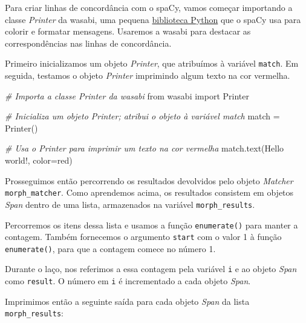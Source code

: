 \documentclass[
  brazilian,
]{article}
\newenvironment{Shaded}{}{}
\newcommand{\CommentTok}[1]{\textcolor[rgb]{0.38,0.63,0.69}{\textit{#1}}}
\newcommand{\ImportTok}[1]{#1}
\newcommand{\NormalTok}[1]{#1}
\newcommand{\OperatorTok}[1]{\textcolor[rgb]{0.40,0.40,0.40}{#1}}
\newcommand{\StringTok}[1]{\textcolor[rgb]{0.25,0.44,0.63}{#1}}
\begin{document}
Para criar linhas de concordância com o spaCy, vamos começar importando
a classe \emph{Printer} da wasabi, uma pequena
\href{https://pypi.org/project/wasabi/}{biblioteca Python} que o spaCy
usa para colorir e formatar mensagens. Usaremos a wasabi para destacar
as correspondências nas linhas de concordância.

Primeiro inicializamos um objeto \emph{Printer}, que atribuímos à
variável \texttt{match}. Em seguida, testamos o objeto \emph{Printer}
imprimindo algum texto na cor vermelha.

\begin{Shaded}
\begin{Highlighting}[]
\CommentTok{\# Importa a classe Printer da wasabi}
\ImportTok{from}\NormalTok{ wasabi }\ImportTok{import}\NormalTok{ Printer}

\CommentTok{\# Inicializa um objeto Printer; atribui o objeto à variável \textquotesingle{}match\textquotesingle{}}
\NormalTok{match }\OperatorTok{=}\NormalTok{ Printer()}

\CommentTok{\# Usa o Printer para imprimir um texto na cor vermelha}
\NormalTok{match.text(}\StringTok{\textquotesingle{}Hello world!\textquotesingle{}}\NormalTok{, color}\OperatorTok{=}\StringTok{\textquotesingle{}red\textquotesingle{}}\NormalTok{)}
\end{Highlighting}
\end{Shaded}

Prosseguimos então percorrendo os resultados devolvidos pelo objeto
\emph{Matcher} \texttt{morph\_matcher}. Como aprendemos acima, os
resultados consistem em objetos \emph{Span} dentro de uma lista,
armazenados na variável \texttt{morph\_results}.

Percorremos os itens dessa lista e usamos a função \texttt{enumerate()}
para manter a contagem. Também fornecemos o argumento \texttt{start} com
o valor 1 à função \texttt{enumerate()}, para que a contagem comece no
número 1.

Durante o laço, nos referimos a essa contagem pela variável \texttt{i} e
ao objeto \emph{Span} como \texttt{result}. O número em \texttt{i} é
incrementado a cada objeto \emph{Span}.

Imprimimos então a seguinte saída para cada objeto \emph{Span} da lista
\texttt{morph\_results}:
\end{document}
